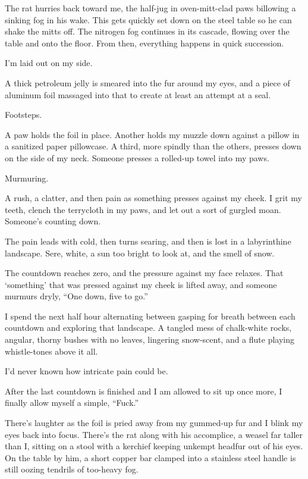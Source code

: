 The rat hurries back toward me, the half-jug in oven-mitt-clad paws billowing a sinking fog in his wake. This gets quickly set down on the steel table so he can shake the mitts off. The nitrogen fog continues in its cascade, flowing over the table and onto the floor. From then, everything happens in quick succession.

I'm laid out on my side.

A thick petroleum jelly is smeared into the fur around my eyes, and a piece of aluminum foil massaged into that to create at least an attempt at a seal.

Footsteps.

A paw holds the foil in place. Another holds my muzzle down against a pillow in a sanitized paper pillowcase. A third, more spindly than the others, presses down on the side of my neck. Someone presses a rolled-up towel into my paws.

Murmuring.

A rush, a clatter, and then pain as something presses against my cheek. I grit my teeth, clench the terrycloth in my paws, and let out a sort of gurgled moan. Someone's counting down.

The pain leads with cold, then turns searing, and then is lost in a labyrinthine landscape. Sere, white, a sun too bright to look at, and the smell of snow.

The countdown reaches zero, and the pressure against my face relaxes. That `something' that was pressed against my cheek is lifted away, and someone murmurs dryly, ``One down, five to go.''

I spend the next half hour alternating between gasping for breath between each countdown and exploring that landscape. A tangled mess of chalk-white rocks, angular, thorny bushes with no leaves, lingering snow-scent, and a flute playing whistle-tones above it all.

I'd never known how intricate pain could be.

After the last countdown is finished and I am allowed to sit up once more, I finally allow myself a simple, ``Fuck.''

There's laughter as the foil is pried away from my gummed-up fur and I blink my eyes back into focus. There's the rat along with his accomplice, a weasel far taller than I, sitting on a stool with a kerchief keeping unkempt headfur out of his eyes. On the table by him, a short copper bar clamped into a stainless steel handle is still oozing tendrils of too-heavy fog.

